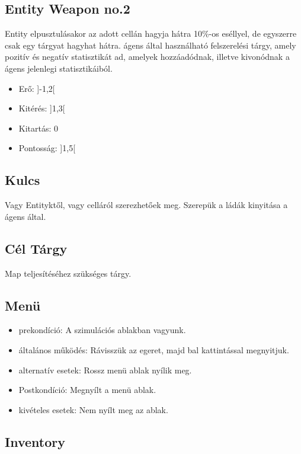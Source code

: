 \subsection{Entity Weapon no.2}

Entity elpusztulásakor az adott cellán hagyja hátra 10\%-os eséllyel, de egyszerre csak egy tárgyat hagyhat hátra.
ágens által használható felszerelési tárgy, amely pozitív és negatív statisztikát ad, amelyek hozzáadódnak, illetve kivonódnak a ágens jelenlegi statisztikáiból.

\begin{itemize}
    \item Erő: ]-1,2[
    \item Kitérés: ]1,3[
    \item Kitartás: 0
    \item Pontosság: ]1,5[
\end{itemize}

\subsection{Kulcs}

Vagy Entityktől, vagy celláról szerezhetőek meg.
Szerepük a ládák kinyitása a ágens által.

\subsection{Cél Tárgy}

Map teljesítéséhez szükséges tárgy.


\subsection{Menü}

\begin{itemize}
    \item prekondíció: A szimulációs ablakban vagyunk.
    \item általános működés: Rávisszük az egeret, majd bal kattintással megnyitjuk.
    \item alternatív esetek: Rossz menü ablak nyílik meg.
    \item Postkondíció: Megnyílt a menü ablak.
    \item kivételes esetek: Nem nyílt meg az ablak.
\end{itemize}

\subsection{Inventory}

